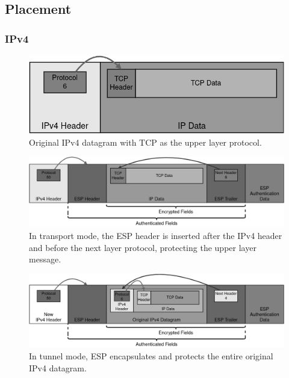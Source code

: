 \documentclass[a4paper,12pt]{report}
\begin{document}
		\newpage
		\subsection{Placement}
		\subsubsection{IPv4}
		
		\begin{figure}[h]
			\includegraphics[width=\textwidth,height=0.15\textheight,keepaspectratio]{original_ipv4_packet}
			\centering
			\caption{Original IPv4 datagram with TCP as the upper layer protocol.}
		\end{figure}
		
		\begin{figure}[h]
			\includegraphics[width=\textwidth]{esp_ipv4_transport}
			\centering
			\caption{In transport mode, the ESP header is inserted after the IPv4 header and before the next layer protocol, protecting the upper layer message.}
		\end{figure}
		
		\begin{figure}[!htb]
			\includegraphics[width=\textwidth]{esp_ipv4_tunnel}
			\centering
			\caption{In tunnel mode, ESP encapsulates and protects the entire original IPv4 datagram.}
		\end{figure}
\newpage
\end{document}
